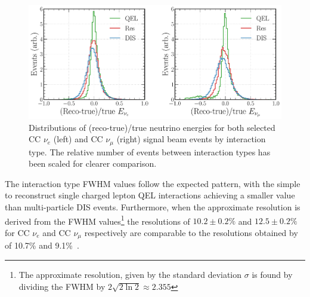 \begin{figure} %
    \includegraphics[width=\textwidth]{diagrams/7-results/final_energy_frac_split.pdf}
    \caption[Distributions of (reco-true)/true neutrino energies by interaction type]
    {Distributions of (reco-true)/true neutrino energies for both selected CC $\nu_{e}$ (left) and
        CC $\nu_{\mu}$ (right) signal beam events by interaction type. The relative number of
        events between interaction types has been scaled for clearer comparison.}
    \label{fig:final_energy_frac_split}
\end{figure}

\begin{table}
    \caption[Summary of CC $\nu_{e}$ and CC $\nu_{\mu}$ FWHM values]
    {Summary of CC $\nu_{e}$ and CC $\nu_{\mu}$ neutrino energy FWHM values. Shown for each sample
        are the FWHM values for all selected signal events and the three dominant interaction type
        components, QEL, Res, and DIS. The FWHM values are calculated from the distributions shown
        in  and . The
        given errors correspond to the statistical uncertainty only.}
    \label{tab:energy_resolutions}
\end{table}

The interaction type FWHM values follow the expected pattern, with the simple to reconstruct
single charged lepton QEL interactions achieving a smaller value than multi-particle DIS events.
Furthermore, when the approximate resolution is derived from the FWHM values\footnote{The
approximate resolution, given by the standard deviation $\sigma$ is found by dividing the FWHM by
$2\sqrt{2\ln2}\approx2.355$} the resolutions of $10.2\pm0.2\%$ and $12.5\pm0.2\%$ for CC $\nu_{e}$
and CC $\nu_{\mu}$ respectively are comparable to the resolutions obtained by \nova of 10.7\% and
9.1\%~\cite{acero2019}.

